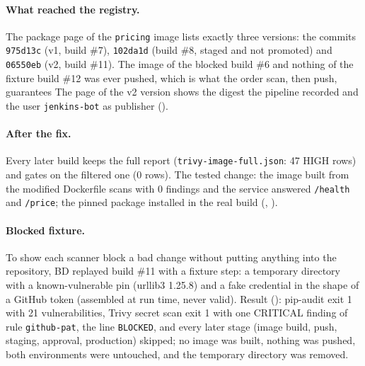\paragraph{What reached the registry.} The package page of the \texttt{pricing} image lists exactly three versions: the commits \texttt{975d13c} (v1, build \#7), \texttt{102da1d} (build \#8, staged and not promoted) and \texttt{06550eb} (v2, build \#11). The image of the blocked build \#6 and nothing of the fixture build \#12 was ever pushed, which is what the order scan, then push, guarantees The page of the v2 version shows the digest the pipeline recorded and the user \texttt{jenkins-bot} as publisher ().

\paragraph{After the fix.} Every later build keeps the full report (\texttt{trivy-image-full.json}: 47 HIGH rows) and gates on the filtered one (0 rows). The tested change: the image built from the modified Dockerfile scans with 0 findings and the service
answered \texttt{/health} and \texttt{/price}; the pinned package installed in the real build (, ).

\paragraph{Blocked fixture.} To show each scanner block a bad change without putting anything into the repository, BD replayed build \#11 with a fixture step: a temporary directory with a known-vulnerable pin (urllib3 1.25.8) and a fake credential in the shape of a GitHub token
(assembled at run time, never valid). Result (): pip-audit exit 1 with 21 vulnerabilities, Trivy secret scan exit 1 with one CRITICAL finding of rule \texttt{github-pat}, the line \texttt{BLOCKED}, and every later stage (image build, push, staging, approval, production)
skipped; no image was built, nothing was pushed, both environments were untouched, and the temporary directory was removed.

